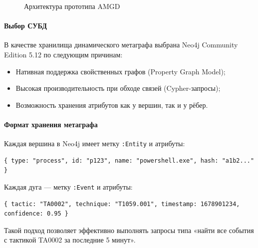 \documentclass{article}
\begin{document}
\begin{figure}[h]
\centering
{}
\caption{Архитектура прототипа AMGD}
\label{fig:amgd_arch_impl}
\end{figure}

\paragraph{Выбор СУБД}
В качестве хранилища динамического метаграфа выбрана Neo4j Community Edition 5.12 по следующим причинам:
\begin{itemize}
    \item Нативная поддержка свойственных графов (Property Graph Model);
    \item Высокая производительность при обходе связей (Cypher-запросы);
    \item Возможность хранения атрибутов как у вершин, так и у рёбер.
\end{itemize}

\paragraph{Формат хранения метаграфа}
Каждая вершина в Neo4j имеет метку \texttt{:Entity} и атрибуты:
\begin{verbatim}
{ type: "process", id: "p123", name: "powershell.exe", hash: "a1b2..." }
\end{verbatim}
Каждая дуга — метку \texttt{:Event} и атрибуты:
\begin{verbatim}
{ tactic: "TA0002", technique: "T1059.001", timestamp: 1678901234, confidence: 0.95 }
\end{verbatim}
Такой подход позволяет эффективно выполнять запросы типа «найти все события с тактикой TA0002 за последние 5 минут».
\end{document}
